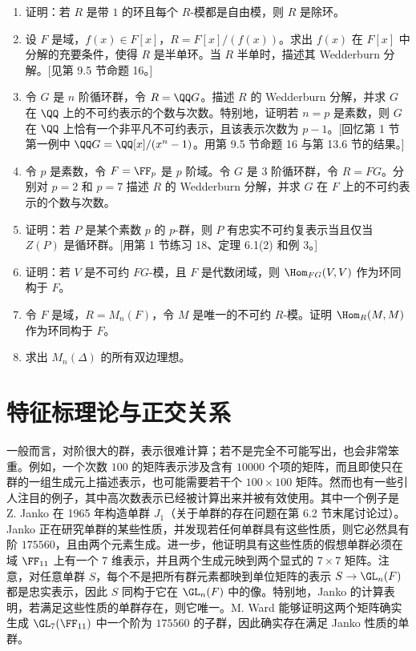 \begin{enumerate}[label=\arabic*.,resume]
  \begin{enumerate}[label=(\alph*)]
    \item 证明 $\Delta\cong\Hom_S(L,L)$，其中 $L$ 是 $S$ 中的极小左理想。推出 $\Delta\cong\Delta'$。[用命题 6(4)。]
    \item 证明除环 $\Delta$ 上有限生成（左）模有“基”（线性无关生成集），且任意两组基具有相同基数。推出 $n=n'$。[模仿第 11.1 节推论 4(2) 的证明。]
  \end{enumerate}
  \item 证明：若 $R$ 是带 $1$ 的环且每个 $R$-模都是自由模，则 $R$ 是除环。
  \item 设 $F$ 是域，$f(x)\in F[x]$，$R=F[x]/(f(x))$。求出 $f(x)$ 在 $F[x]$ 中分解的充要条件，使得 $R$ 是半单环。当 $R$ 半单时，描述其 Wedderburn 分解。[见第 9.5 节命题 16。]
  \item 令 $G$ 是 $n$ 阶循环群，令 $R=\QQ G$。描述 $R$ 的 Wedderburn 分解，并求 $G$ 在 $\QQ$ 上的不可约表示的个数与次数。特别地，证明若 $n=p$ 是素数，则 $G$ 在 $\QQ$ 上恰有一个非平凡不可约表示，且该表示次数为 $p-1$。[回忆第 1 节第一例中 $\QQ G=\QQ[x]/(x^n-1)$。用第 9.5 节命题 16 与第 13.6 节的结果。]
  \item 令 $p$ 是素数，令 $F=\FF_p$ 是 $p$ 阶域。令 $G$ 是 $3$ 阶循环群，令 $R=FG$。分别对 $p=2$ 和 $p=7$ 描述 $R$ 的 Wedderburn 分解，并求 $G$ 在 $F$ 上的不可约表示的个数与次数。
  \item 证明：若 $P$ 是某个素数 $p$ 的 $p$-群，则 $P$ 有忠实不可约复表示当且仅当 $Z(P)$ 是循环群。[用第 1 节练习 18、定理 6.1(2) 和例 3。]
  \item 证明：若 $V$ 是不可约 $FG$-模，且 $F$ 是代数闭域，则 $\Hom_{FG}(V,V)$ 作为环同构于 $F$。
  \item 令 $F$ 是域，$R=M_n(F)$，令 $M$ 是唯一的不可约 $R$-模。证明 $\Hom_R(M,M)$ 作为环同构于 $F$。
  \item 求出 $M_n(\Delta)$ 的所有双边理想。
\end{enumerate}

\section{特征标理论与正交关系}

一般而言，对阶很大的群，表示很难计算；若不是完全不可能写出，也会非常笨重。例如，一个次数 $100$ 的矩阵表示涉及含有 $10000$ 个项的矩阵，而且即使只在群的一组生成元上描述表示，也可能需要若干个 $100\times100$ 矩阵。然而也有一些引人注目的例子，其中高次数表示已经被计算出来并被有效使用。其中一个例子是 Z. Janko 在 1965 年构造单群 $J_1$（关于单群的存在问题在第 6.2 节末尾讨论过）。Janko 正在研究单群的某些性质，并发现若任何单群具有这些性质，则它必然具有阶 $175560$，且由两个元素生成。进一步，他证明具有这些性质的假想单群必须在域 $\FF_{11}$ 上有一个 $7$ 维表示，并且两个生成元映到两个显式的 $7\times7$ 矩阵。注意，对任意单群 $S$，每个不是把所有群元素都映到单位矩阵的表示 $S\to\GL_n(F)$ 都是忠实表示，因此 $S$ 同构于它在 $\GL_n(F)$ 中的像。特别地，Janko 的计算表明，若满足这些性质的单群存在，则它唯一。M. Ward 能够证明这两个矩阵确实生成 $\GL_7(\FF_{11})$ 中一个阶为 $175560$ 的子群，因此确实存在满足 Janko 性质的单群。

